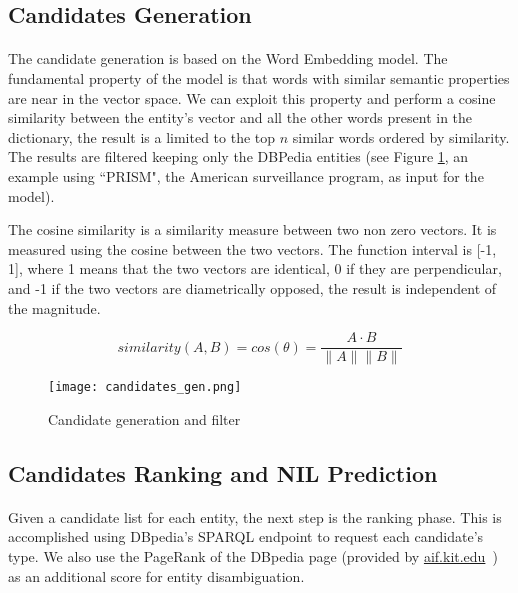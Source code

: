 \subsection{Candidates Generation}
\paragraph{}
The candidate generation is based on the Word Embedding model. The fundamental property of the model is that words with similar semantic properties are near in the vector space. We can exploit this property and perform a cosine similarity between the entity's vector and all the other words present in the dictionary, the result is a limited to the top \(n\) similar words ordered by similarity. The results are filtered keeping only the DBPedia entities (see Figure \ref{fig:candidates_gen}, an example using ``PRISM", the American surveillance program, as input for the model).


The cosine similarity is a similarity measure between two non zero vectors. It is measured using the cosine between the two vectors. The function interval is [-1, 1], where 1 means that the two vectors are identical, 0 if they are perpendicular, and -1 if the two vectors are diametrically opposed, the result is independent of the magnitude. 

\begin{equation}
similarity(A, B) = cos(\theta) = \frac{A \cdot B}{\lVert A \rVert \lVert B \rVert}
\end{equation}


\begin{figure}[h]
\texttt{[image: candidates\_gen.png]}
\caption{Candidate generation and filter}
\label{fig:candidates_gen}
\end{figure}

\subsection{Candidates Ranking and NIL Prediction }
\paragraph{}
Given a candidate list for each entity, the next step is the ranking phase. This is accomplished using DBpedia's SPARQL endpoint to request each candidate's type. We also use the PageRank of the DBpedia page (provided by \href{http://people.aifb.kit.edu/ath/}{aif.kit.edu}~\cite{Thalhammer2016}) as an additional score for entity disambiguation.

